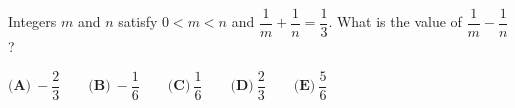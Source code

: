 Integers $m$ and $n$ satisfy $0<m<n$ and $\dfrac{1}{m}+\dfrac{1}{n}=\dfrac{1}{3}$. What is the value of $\dfrac{1}{m}-\dfrac{1}{n}$?

$\textbf{(A)}\ -\dfrac{2}{3}\qquad\textbf{(B)}\ -\dfrac{1}{6}\qquad\textbf{(C)}\ \dfrac{1}{6}\qquad\textbf{(D)}\ \dfrac{2}{3}\qquad\textbf{(E)}\ \dfrac{5}{6}$
